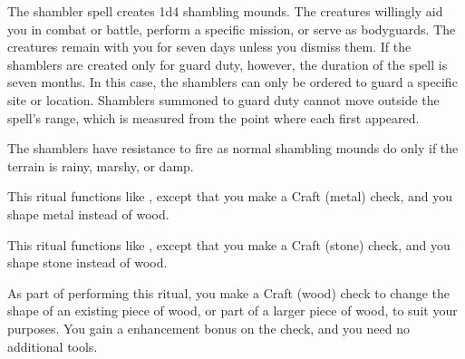 \spellrng{\rngmed}
\begin{spelleffect}
The shambler spell creates 1d4 shambling mounds. The creatures willingly aid you in combat or battle, perform a specific mission, or serve as bodyguards. The creatures remain with you for seven days unless you dismiss them. If the shamblers are created only for guard duty, however, the duration of the spell is seven months. In this case, the shamblers can only be ordered to guard a specific site or location. Shamblers summoned to guard duty cannot move outside the spell's range, which is measured from the point where each first appeared. 
\par The shamblers have resistance to fire as normal shambling mounds do only if the terrain is rainy, marshy, or damp.
\end{spelleffect}

\begin{spelleffect}
    This ritual functions like , except that you make a Craft (metal) check, and you shape metal instead of wood. 
\end{spelleffect}

\begin{spelleffect}
    This ritual functions like , except that you make a Craft (stone) check, and you shape stone instead of wood.
\end{spelleffect}

\begin{spelleffect}
    As part of performing this ritual, you make a Craft (wood) check to change the shape of an existing piece of wood, or part of a larger piece of wood, to suit your purposes. You gain a  enhancement bonus on the check, and you need no additional tools.
\end{spelleffect}

